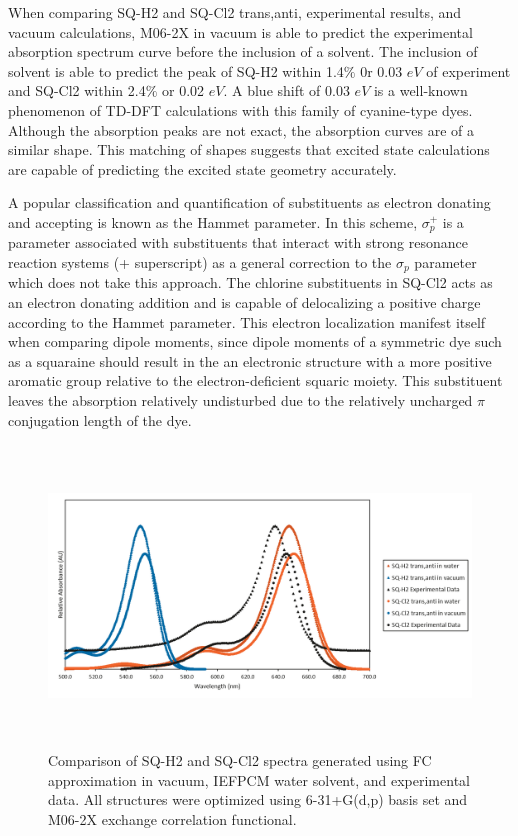 \documentclass[journal=jacsat,manuscript=article]{achemso}
\begin{document}
When comparing SQ-H2 and SQ-Cl2 trans,anti, experimental results, and vacuum calculations, M06-2X in vacuum is able to predict the experimental absorption spectrum curve before the inclusion of a solvent. The inclusion of solvent is able to predict the peak of SQ-H2 within 1.4$\%$ 0r 0.03 $eV$ of experiment and SQ-Cl2 within 2.4$\%$ or 0.02 $eV$. A blue shift of 0.03 $eV$ is a well-known phenomenon of TD-DFT calculations with this family of cyanine-type dyes\cite{Jacquemin2011Excited-stateEnvironments}. Although the absorption peaks are not exact, the absorption curves are of a similar shape. This matching of shapes suggests that excited state calculations are capable of predicting the excited state geometry accurately. 

A popular classification and quantification of substituents as electron donating and accepting is known as the Hammet parameter\cite{Hansch1991AParameters}. In this scheme, $\sigma_{p}^{+}$ is a parameter associated with substituents that interact with strong resonance reaction systems (+ superscript) as a general correction to the $\sigma_{p}$ parameter which does not take this approach. The chlorine substituents in SQ-Cl2 acts as an electron donating addition and is capable of delocalizing a positive charge according to the Hammet parameter. This electron localization manifest itself when comparing dipole moments, since dipole moments of a symmetric dye such as a squaraine should result in the an electronic structure with a more positive aromatic group relative to the electron-deficient squaric moiety. This substituent leaves the absorption relatively undisturbed due to the relatively uncharged $\pi$ conjugation length of the dye\cite{Punitharasu2019-ExtendedResponse}.


\begin{figure}[h]
    \centering
    \includegraphics[width=15cm,height=8cm]{figures/sq1-sq4.png}
    \caption{Comparison of  SQ-H2 and SQ-Cl2 spectra generated using FC approximation in vacuum, IEFPCM water solvent, and experimental data. All structures were optimized using 6-31+G(d,p) basis set and M06-2X exchange correlation functional.}
    \label{fig:SQ1 and SQ4}
\end{figure}
\end{document}
